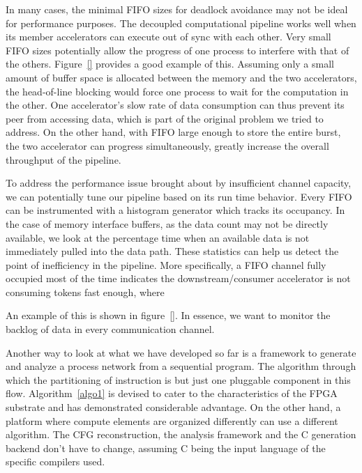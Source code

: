 In many cases, the minimal FIFO sizes for deadlock avoidance may not be ideal for performance purposes. The decoupled computational pipeline works well when its member accelerators
can execute out of sync with each other. Very small FIFO sizes potentially allow the progress
of one process to interfere with that of the others. Figure~\ref{} provides a good example
of this. Assuming only a small amount of buffer space is allocated between the memory
and the two accelerators, the head-of-line blocking would force one process to wait for
the computation in the other. One accelerator's slow rate of data consumption can thus 
prevent its peer from accessing data, which is part of the original problem we tried to address.
On the other hand, with FIFO large enough to store the entire burst, the two accelerator
can progress simultaneously, greatly increase the overall throughput of the pipeline.

To address the performance issue brought about by insufficient channel capacity, we can potentially tune our pipeline based on its run time behavior. 
Every 
FIFO can be instrumented with a histogram generator
which tracks its occupancy. 
In the case of 
memory interface buffers, as the data count may not be directly available, we look at the percentage time when an available data is not immediately pulled into the data path. These statistics can help us detect the
point of inefficiency in the pipeline. More specifically, a FIFO channel fully occupied most of
the time indicates the downstream/consumer accelerator
is not consuming tokens fast enough, where


An example of this is shown in figure~\ref{}. In essence, we want to monitor the backlog of data
in every communication channel. 


Another way to look at what we have developed so far is a framework to generate and analyze a process network from a sequential program. The algorithm through which
the partitioning of instruction is but just one pluggable component in this flow.
Algorithm~\ref{algo1} is devised to cater to the characteristics of the FPGA substrate and has demonstrated considerable advantage. On the other hand, a platform
where compute elements are organized differently can use a different algorithm.
The CFG reconstruction, the analysis framework and the C generation backend don't 
have to change, assuming C being the input language of the specific compilers used.

